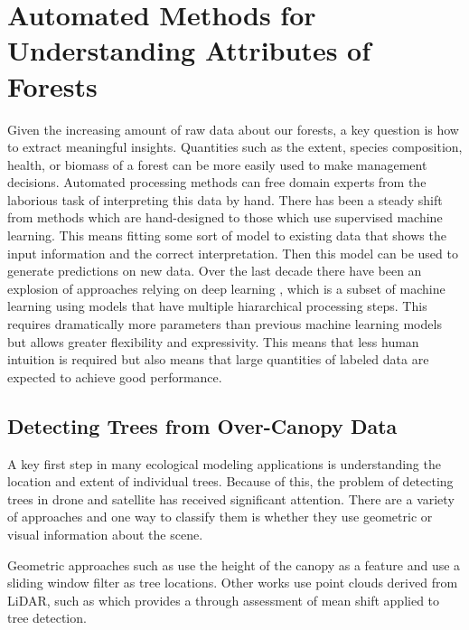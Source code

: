\section{Automated Methods for Understanding Attributes of Forests}
Given the increasing amount of raw data about our forests, a key question is how to extract meaningful insights. Quantities such as the extent, species composition, health, or biomass of a forest can be more easily used to make management decisions. Automated processing methods can free domain experts from the laborious task of interpreting this data by hand. There has been a steady shift from methods which are hand-designed to those which use supervised machine learning. This means fitting some sort of model to existing data that shows the input information and the correct interpretation. Then this model can be used to generate predictions on new data. Over the last decade there have been an explosion of approaches relying on deep learning \cite{Lecun2015DeepLearning}, which is a subset of machine learning using models that have multiple hiararchical processing steps. This requires dramatically more parameters than previous machine learning models but allows greater flexibility and expressivity. This means that less human intuition is required but also means that large quantities of labeled data are expected to achieve good performance. 


\subsection{Detecting Trees from Over-Canopy Data}
A key first step in many ecological modeling applications is understanding the location and extent of individual trees. Because of this, the problem of detecting trees in drone and satellite has received significant attention. There are a variety of approaches and one way to classify them is whether they use geometric or visual information about the scene. 

Geometric approaches such as \cite{Popescu2004SeeingHeight} use the height of the canopy as a feature and use a sliding window filter as tree locations. Other works use point clouds derived from LiDAR, such as \cite{Xiao2019MeanData} which provides a through assessment of mean shift applied to tree detection.

